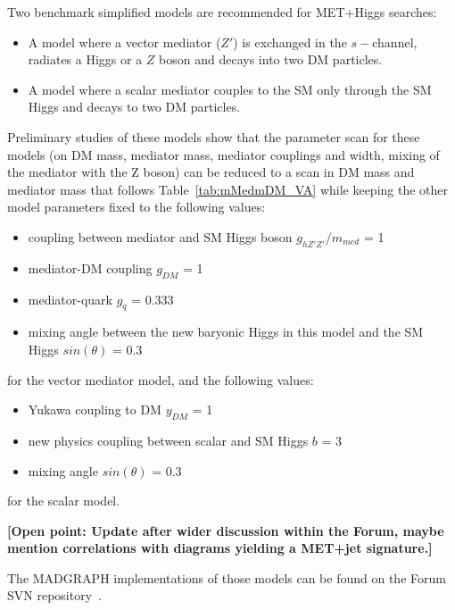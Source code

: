 \documentclass[a4,debug,notitlepage,nobib]{tufte-handout}
\begin{document}
Two benchmark simplified models \cite{Carpenter:2013xra} 
are recommended for MET+Higgs searches:
\begin{itemize}
 \item A model where a vector mediator ($Z'$) is exchanged in the $s-$channel, 
 radiates a Higgs or a $Z$ boson and decays into two DM particles. 
 \item A model where a scalar mediator couples to the SM only 
 through the SM Higgs and decays to two DM particles. 
\end{itemize}

Preliminary studies of these models show that the parameter scan for 
these models (on DM mass, mediator mass, mediator couplings and
width, mixing of the mediator with the Z boson) can be reduced to 
a scan in DM mass and mediator mass that follows Table~\ref{tab:mMedmDM_VA} while keeping 
the other model parameters fixed to the following values: 
\begin{itemize}
 \item coupling between mediator and SM Higgs boson $g_{hZ'Z'}/m_{med}$ = 1
 \item mediator-DM coupling $g_{DM}$ = 1
 \item mediator-quark $g_{q}$ = 0.333
 \item mixing angle between the new baryonic Higgs in this model and the SM Higgs $sin(\theta)$ = 0.3
\end{itemize}
for the vector mediator model, and the following values: 
\begin{itemize}
 \item Yukawa coupling to DM $y_{DM}$ = 1
 \item new physics coupling between scalar and SM Higgs $b$ = 3
 \item mixing angle $sin(\theta)$ = 0.3
\end{itemize}
for the scalar model. 

\textbf{[Open point: Update after wider discussion within the Forum, 
maybe mention correlations with diagrams yielding a MET+jet signature.]}

The MADGRAPH implementations of those models can be found on the Forum SVN 
repository~\cite{ForumSVN_EWMonoHiggs}.

\end{document}
